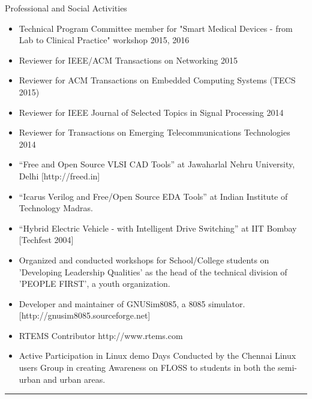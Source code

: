 \documentclass[11pt,oneside]{article}
\newenvironment{ressection}[1]{
	\vspace{4pt}
	{\fontfamily{phv}\selectfont\Large#1}
	\begin{itemize}
	\vspace{3pt}
}{
	\end{itemize}
}
\newcommand{\resitem}[1]{
	\vspace{-4pt}
	\item \begin{flushleft} #1 \end{flushleft}
}
\newcommand{\ressubitem}[1]{
	\vspace{-1pt}
	\item \begin{flushleft} #1 \end{flushleft}
}
\begin{document}

 \begin{ressection}{Professional and Social Activities}
 	\resitem{Technical Program Committee member for "Smart Medical Devices - from Lab to Clinical Practice" workshop 2015, 2016}
 	\resitem{Reviewer for IEEE/ACM Transactions on Networking 2015}
 	 \resitem{Reviewer for ACM Transactions on Embedded Computing Systems (TECS 2015)}
 	 \resitem{Reviewer for IEEE Journal of Selected Topics in Signal Processing 2014} 
 	 \resitem{Reviewer for Transactions on Emerging Telecommunications Technologies 2014}
 	\resitem{``Free and Open Source VLSI CAD Tools'' at Jawaharlal Nehru University, Delhi [http://freed.in]}
 	\resitem{``Icarus Verilog and Free/Open Source EDA Tools'' at Indian Institute of Technology Madras.}
     \resitem{``Hybrid Electric Vehicle - with Intelligent Drive Switching'' at IIT Bombay [Techfest 2004]}
     \resitem{Organized and conducted workshops for School/College students on 'Developing Leadership Qualities' as the head of the technical division of 'PEOPLE FIRST', a youth organization.}
     \ressubitem{Developer and maintainer of GNUSim8085, a 8085 simulator. [http://gnusim8085.sourceforge.net]}
	 \ressubitem{RTEMS Contributor http://www.rtems.com}
     \resitem{Active Participation in Linux demo Days Conducted by the Chennai Linux users Group in creating Awareness on FLOSS to students in both the semi-urban and urban areas.}
    
 \end{ressection}
 \rule{\textwidth}{.5pt}
\end{document}

